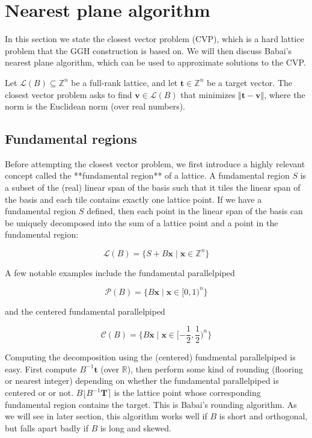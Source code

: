 \section{Nearest plane algorithm}
In this section we state the closest vector problem (CVP), which is a hard lattice problem that the GGH construction is based on. We will then discuss Babai's nearest plane algorithm, which can be used to approximate solutions to the CVP.

Let $\mathcal{L}(B) \subseteq \mathbb{Z}^n$ be a full-rank lattice, and let $\mathbf{t} \in \mathbb{Z}^n$ be a target vector. The closest vector problem asks to find $\mathbf{v} \in \mathcal{L}(B)$ that minimizes $\Vert \mathbf{t} - \mathbf{v} \Vert$, where the norm is the Euclidean norm (over real numbers).

\subsection{Fundamental regions}
Before attempting the closest vector problem, we first introduce a highly relevant concept called the **fundamental region** of a lattice. A fundamental region $S$ is a subset of the (real) linear span of the basis such that it tiles the linear span of the basis and each tile contains exactly one lattice point. If we have a fundamental region $S$ defined, then each point in the linear span of the basis can be uniquely decomposed into the sum of a lattice point and a point in the fundamental region:

$$
\mathcal{L}(B) = \{S + B\mathbf{x} \mid \mathbf{x} \in \mathbb{Z}^n\}
$$

A few notable examples include the fundamental parallelpiped 

$$
\mathcal{P}(B) = \{B\mathbf{x} \mid \mathbf{x} \in [0, 1)^n\}
$$

and the centered fundamental parallelpiped

$$
\mathcal{C}(B) = \{B\mathbf{x} \mid \mathbf{x} \in [-\frac{1}{2}, \frac{1}{2})^n\}
$$

Computing the decomposition using the (centered) fundmental parallelpiped is easy. First compute $B^{-1}\mathbf{t}$ (over $\mathbb{R}$), then perform some kind of rounding (flooring or nearest integer) depending on whether the fundamental parallelpiped is centered or or not. $B\lfloor B^{-1}\mathbf{T} \rceil$ is the lattice point whose corresponding fundamental region contains the target. This is Babai's rounding algorithm. As we will see in later section, this algorithm works well if $B$ is short and orthogonal, but falls apart badly if $B$ is long and skewed.


